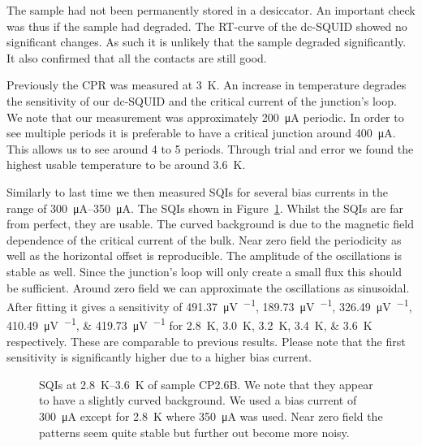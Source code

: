 The sample had not been permanently stored in a desiccator. An important check was thus if the sample had degraded. The RT-curve of the dc-SQUID showed no significant changes. As such it is unlikely that the sample degraded significantly. It also confirmed that all the contacts are still good.

Previously the CPR was measured at \qty{3}{\kelvin}. An increase in temperature degrades the sensitivity of our dc-SQUID and the critical current of the junction's loop. We note that our measurement was approximately \qty{200}{\micro\ampere} periodic. In order to see multiple periods it is preferable to have a critical junction around \qty{400}{\micro\ampere}. This allows us to see around 4 to 5 periods. Through trial and error we found the highest usable temperature to be around \qty{3.6}{\kelvin}.

Similarly to last time we then measured SQIs for several bias currents in the range of \qtyrange{300}{350}{\micro\ampere}. The SQIs shown in Figure~\ref{fig:CP2.6B_revisited_SQIs}. Whilst the SQIs are far from perfect, they are usable. The curved background is due to the magnetic field dependence of the critical current of the bulk. Near zero field the periodicity as well as the horizontal offset is reproducible. The amplitude of the oscillations is stable as well. Since the junction's loop will only create a small flux this should be sufficient. Around zero field we can approximate the oscillations as sinusoidal. After fitting it gives a sensitivity of \qtylist{491.37;189.73;326.49;410.49;419.73}{\micro\volt\per\fluxquantum} for \qtylist{2.8;3.0;3.2;3.4;3.6}{\kelvin} respectively. These are comparable to previous results. Please note that the first sensitivity is significantly higher due to a higher bias current.

\begin{figure}[ht!]
	\centering
	
	\caption{SQIs at \qtyrange{2.8}{3.6}{\kelvin} of sample CP2.6B. We note that they appear to have a slightly curved background. We used a bias current of \qty{300}{\micro\ampere} except for \qty{2.8}{\kelvin} where \qty{350}{\micro\ampere} was used. Near zero field the patterns seem quite stable but further out become more noisy.}
	\label{fig:CP2.6B_revisited_SQIs}
\end{figure}

